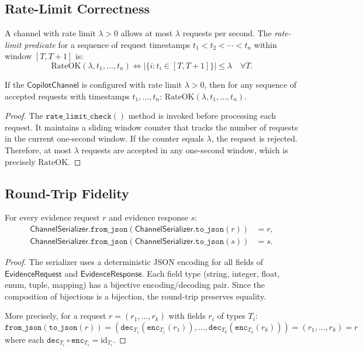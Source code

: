 \documentclass[11pt]{article}
\newcommand{\CopChan}{\mathsf{CopilotChannel}}
\newcommand{\ChanSer}{\mathsf{ChannelSerializer}}
\newcommand{\EvReq}{\mathsf{EvidenceRequest}}
\newcommand{\EvResp}{\mathsf{EvidenceResponse}}
\begin{document}
\subsection{Rate-Limit Correctness}
\label{sec:formal:rate}

\begin{definition}
\label{def:rate-limited}
A channel with rate limit $\lambda > 0$ allows at most
$\lambda$ requests per second.  The \emph{rate-limit predicate}
for a sequence of request timestamps $t_1 < t_2 < \cdots < t_n$
within window $[T, T+1]$ is:
\[
  \mathrm{RateOK}(\lambda, t_1, \ldots, t_n) \iff
  |\{i : t_i \in [T, T+1]\}| \leq \lambda \quad \forall T.
\]
\end{definition}

\begin{theorem}
\label{thm:rate-limit}
If the $\CopChan$ is configured with rate limit $\lambda > 0$,
then for any sequence of accepted requests with timestamps
$t_1, \ldots, t_n$:
$\mathrm{RateOK}(\lambda, t_1, \ldots, t_n)$.
\end{theorem}

\begin{proof}
The $\texttt{rate\_limit\_check}()$ method is invoked before
processing each request.  It maintains a sliding window counter
that tracks the number of requests in the current one-second
window.  If the counter equals $\lambda$, the request is rejected.
Therefore, at most $\lambda$ requests are accepted in any
one-second window, which is precisely $\mathrm{RateOK}$.
\end{proof}

\subsection{Round-Trip Fidelity}
\label{sec:formal:roundtrip}

\begin{theorem}
\label{thm:round-trip}
For every evidence request $r$ and evidence response $s$:
\begin{align*}
  \ChanSer.\texttt{from\_json}(\ChanSer.\texttt{to\_json}(r)) &= r, \\
  \ChanSer.\texttt{from\_json}(\ChanSer.\texttt{to\_json}(s)) &= s.
\end{align*}
\end{theorem}

\begin{proof}
The serializer uses a deterministic JSON encoding for all fields
of $\EvReq$ and $\EvResp$.  Each field type (string, integer,
float, enum, tuple, mapping) has a bijective encoding/decoding pair.
Since the composition of bijections is a bijection, the round-trip
preserves equality.

More precisely, for a request $r = (r_1, \ldots, r_k)$ with fields
$r_i$ of types $T_i$:
\[
  \texttt{from\_json}(\texttt{to\_json}(r))
  = (\texttt{dec}_{T_1}(\texttt{enc}_{T_1}(r_1)), \ldots,
     \texttt{dec}_{T_k}(\texttt{enc}_{T_k}(r_k)))
  = (r_1, \ldots, r_k) = r
\]
where each $\texttt{dec}_{T_i} \circ \texttt{enc}_{T_i} = \mathrm{id}_{T_i}$.
\end{proof}
\end{document}
